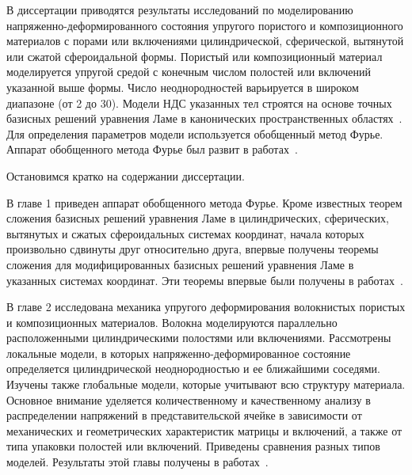 В диссертации приводятся результаты исследований по моделированию на\-пря\-же\-н\-но-де\-фор\-ми\-ро\-ва\-н\-но\-го состояния упругого пористого и композиционного материалов с порами или включениями цилиндрической, сферической, вытянутой или сжатой сфероидальной формы. Пористый или композиционный материал моделируется упругой средой с конечным числом полостей или включений указанной выше формы. Число неоднородностей варьируется в широком диапазоне (от 2 до 30). 
Модели НДС указанных тел строятся на основе точных базисных решений уравнения Ламе в канонических пространственных областях~\cite{Nikolaev1993, Nikolaev1998, Nikolaev1984}. Для определения параметров модели используется обобщенный метод Фурье. Аппарат обобщенного метода Фурье был развит в работах~\cite{Nikolaev1998, Nikolaev2011, Nikolaev1998-1, Nikolaev1993, Nikolaev1984}.

Остановимся кратко на содержании диссертации.

В главе 1 приведен аппарат обобщенного метода Фурье. Кроме известных теорем сложения базисных решений уравнения Ламе в цилиндрических, сферических, вытянутых и сжатых сфероидальных системах координат, начала которых произвольно сдвинуты друг относительно друга, впервые получены теоремы сложения для модифицированных базисных решений уравнения Ламе в указанных системах координат. Эти теоремы впервые были получены в работах~\cite{Nikolaev2014-1, Nikolaev2014-9}.

В главе 2 исследована механика упругого деформирования волокнистых пористых и композиционных материалов. Волокна моделируются параллельно расположенными цилиндрическими полостями или включениями. Рассмотрены локальные модели, в которых напряженно-деформированное состояние определяется цилиндрической неоднородностью и ее ближайшими соседями. Изучены также глобальные модели, которые учитывают всю структуру материала. Основное внимание уделяется количественному и качественному анализу в распределении напряжений в представительской ячейке в зависимости от механических и геометрических характеристик матрицы и включений, а также от типа упаковки полостей или включений. Приведены сравнения разных типов моделей. Результаты этой главы получены в работах~\cite{Nikolaev2013-1, Nikolaev2013-2, Nikolaev2013-4, Nikolaev2013-3, Nikolaev2015-1}.
 
